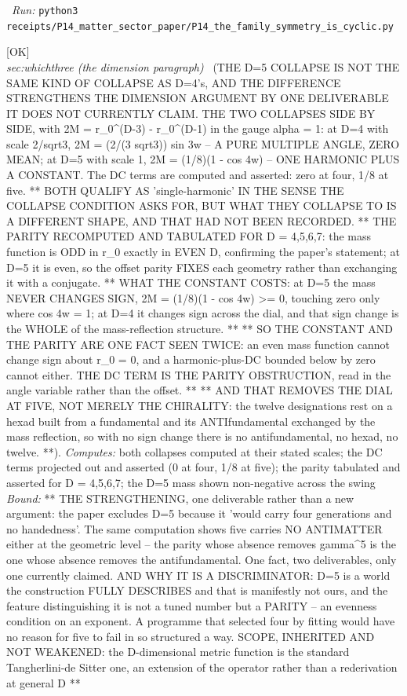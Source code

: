 \begin{description}
\ \emph{Run:} \texttt{python3 receipts/P14\_matter\_sector\_paper/P14\_the\_family\_symmetry\_is\_cyclic.py}
\item[\label{rcpt:P14_the_d5_world}\texttt{P14\_the\_d5\_world}]\hfill\textsf{[OK]}\\
\textit{sec:whichthree (the dimension paragraph)} \ (THE D=5 COLLAPSE IS NOT THE SAME KIND OF COLLAPSE AS D=4's, AND THE DIFFERENCE STRENGTHENS THE DIMENSION ARGUMENT BY ONE DELIVERABLE IT DOES NOT CURRENTLY CLAIM. THE TWO COLLAPSES SIDE BY SIDE, with 2M = r\_0\textasciicircum{}(D-3) - r\_0\textasciicircum{}(D-1) in the gauge alpha = 1: at D=4 with scale 2/sqrt3, 2M = (2/(3 sqrt3)) sin 3w -- A PURE MULTIPLE ANGLE, ZERO MEAN; at D=5 with scale 1, 2M = (1/8)(1 - cos 4w) -- ONE HARMONIC PLUS A CONSTANT. The DC terms are computed and asserted: zero at four, 1/8 at five. ** BOTH QUALIFY AS 'single-harmonic' IN THE SENSE THE COLLAPSE CONDITION ASKS FOR, BUT WHAT THEY COLLAPSE TO IS A DIFFERENT SHAPE, AND THAT HAD NOT BEEN RECORDED. ** THE PARITY RECOMPUTED AND TABULATED FOR D = 4,5,6,7: the mass function is ODD in r\_0 exactly in EVEN D, confirming the paper's statement; at D=5 it is even, so the offset parity FIXES each geometry rather than exchanging it with a conjugate. ** WHAT THE CONSTANT COSTS: at D=5 the mass NEVER CHANGES SIGN, 2M = (1/8)(1 - cos 4w) >= 0, touching zero only where cos 4w = 1; at D=4 it changes sign across the dial, and that sign change is the WHOLE of the mass-reflection structure. ** ** SO THE CONSTANT AND THE PARITY ARE ONE FACT SEEN TWICE: an even mass function cannot change sign about r\_0 = 0, and a harmonic-plus-DC bounded below by zero cannot either. THE DC TERM IS THE PARITY OBSTRUCTION, read in the angle variable rather than the offset. ** ** AND THAT REMOVES THE DIAL AT FIVE, NOT MERELY THE CHIRALITY: the twelve designations rest on a hexad built from a fundamental and its ANTIfundamental exchanged by the mass reflection, so with no sign change there is no antifundamental, no hexad, no twelve. **). 
\emph{Computes:} both collapses computed at their stated scales; the DC terms projected out and asserted (0 at four, 1/8 at five); the parity tabulated and asserted for D = 4,5,6,7; the D=5 mass shown non-negative across the swing
 \emph{Bound:} ** THE STRENGTHENING, one deliverable rather than a new argument: the paper excludes D=5 because it 'would carry four generations and no handedness'. The same computation shows five carries NO ANTIMATTER either at the geometric level -- the parity whose absence removes gamma\textasciicircum{}5 is the one whose absence removes the antifundamental. One fact, two deliverables, only one currently claimed. AND WHY IT IS A DISCRIMINATOR: D=5 is a world the construction FULLY DESCRIBES and that is manifestly not ours, and the feature distinguishing it is not a tuned number but a PARITY -- an evenness condition on an exponent. A programme that selected four by fitting would have no reason for five to fail in so structured a way. SCOPE, INHERITED AND NOT WEAKENED: the D-dimensional metric function is the standard Tangherlini-de Sitter one, an extension of the operator rather than a rederivation at general D **

\end{description}
